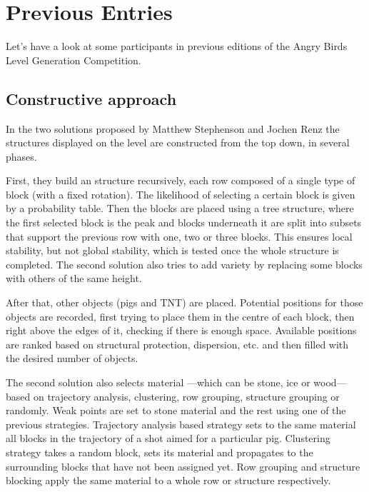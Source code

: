 \chapter{Previous Entries}\label{ch:otherSolutions}
Let's have a look at some participants in previous editions of the Angry Birds Level Generation Competition.

\section{Constructive approach}
In the two solutions proposed by Matthew Stephenson and Jochen Renz \cite{stephenson2017generating} \cite{stephenson2016procedural} the structures displayed on the level are constructed from the top down, in several phases. 

First, they build an structure recursively, each row composed of a single type of block (with a fixed rotation). The likelihood of selecting a certain block is given by a probability table. Then the blocks are placed using a tree structure, where the first selected block is the peak and blocks underneath it are split into subsets that support the previous row with one, two or three blocks. This ensures local stability, but not global stability, which is tested once the whole structure is completed. The second solution also tries to add variety by replacing some blocks with others of the same height.

After that, other objects (pigs and TNT) are placed. Potential positions for those objects are recorded, first trying to place them in the centre of each block, then right above the edges of it, checking if there is enough space. Available positions are ranked based on structural protection, dispersion, etc. and then filled with the desired number of objects.

The second solution also selects material ---which can be stone, ice or wood--- based on trajectory analysis, clustering, row grouping, structure grouping or randomly. Weak points are set to stone material and the rest using one of the previous strategies. Trajectory analysis based strategy sets to the same material all blocks in the trajectory of a shot aimed for a particular pig. Clustering strategy takes a random block, sets its material and propagates to the surrounding blocks that have not been assigned yet. Row grouping and structure blocking apply the same material to a whole row or structure respectively.

